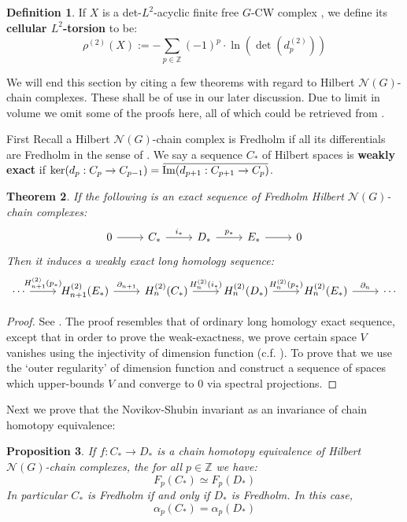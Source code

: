 \documentclass[11pt]{report}
\theoremstyle{definition}
\newtheorem{Def}{Definition}[chapter]
\theoremstyle{plain}
\newtheorem{Prop}[Def]{Proposition}
\newtheorem{Theo}[Def]{Theorem}
\DeclareMathOperator{\im}{Im}
\newcommand{\integer}{\mathbb{Z}}
\newcommand{\vna}{\mathcal{N}}
\newcommand{\overbar}[1]{\mkern 1.5mu\overline{\mkern-1.5mu#1\mkern-1.5mu}\mkern 1.5mu}
\renewcommand{\bar}{\overbar}
\begin{document}
\begin{Def}
	If $X$ is a det-$L^2$-acyclic finite free $G$-CW complex , we define its \textbf{cellular $L^2$-torsion} to be:
	\begin{equation}
	\rho^{(2)}(X):=-\sum_{p\in \integer}(-1)^p\cdot \ln(\det(d_{p}^{(2)}))
	\end{equation}
\end{Def}
We will end this section by citing a few theorems with regard to Hilbert $\vna(G)$-chain complexes. These shall be of use in our later discussion. Due to limit in volume we omit some of the proofs here, all of which could be retrieved from \cite[Chapter~I \& II]{luck2013}.
\par First Recall a Hilbert $\vna(G)$-chain complex is Fredholm if all its differentials are Fredholm in the sense of . We say a sequence $C_*$ of Hilbert spaces is \textbf{weakly exact} if $\ker (d_p:C_p\to C_{p-1})=\bar{\im(d_{p+1}:C_{p+1}\to C_p)}$.
\begin{Theo}\label{1.21}
	If the following is an exact sequence of Fredholm Hilbert $\vna(G)$-chain complexes:
	\begin{equation*}
	\begin{tikzcd}
	0 \rar &C_*\rar{i_*} &D_*\rar{p_*} & E_*\rar &0
	\end{tikzcd}
	\end{equation*}
	Then it induces a weakly exact long homology sequence:
	\begin{equation}
	\begin{tikzcd}
	\cdots \rar{H^{(2)}_{n+1}(p_*)} &H^{(2)}_{n+1}(E_*)\rar{\partial_{n+1}}&H_n^{(2)}(C_*) \rar{H_n^{(2)}(i_*)} &H_n^{(2)}(D_*)\rar{H^{(2)}_n(p_*)}&H_n^{(2)}(E_*)\rar{\partial_n}&\cdots
	\end{tikzcd}
	\end{equation}
\end{Theo}
\begin{proof}
	See \cite[Theorem~1.21]{luck2013}. The proof resembles that of ordinary long homology exact sequence, except that in order to prove the weak-exactness, we prove certain space $V$ vanishes using the injectivity of dimension function (c.f. ).  To prove that we use the `outer regularity' of dimension function and construct a sequence of spaces which upper-bounds $V$ and converge to $0$ via spectral projections. 
\end{proof}
Next we prove that the Novikov-Shubin invariant as an invariance of chain homotopy equivalence:
\begin{Prop}\label{2.19}
If $f:C_*\to D_*$ is a chain homotopy equivalence of Hilbert $\vna(G)$-chain complexes, the for all $p\in \integer$ we have:
\begin{equation*}
F_p(C_*)\simeq F_p(D_*)
\end{equation*}
In particular $C_*$ is Fredholm if and only if $D_*$ is Fredholm. In this case,
\begin{equation*}
\alpha_p(C_*)=\alpha_p(D_*)
\end{equation*}
\end{Prop}
\end{document}
